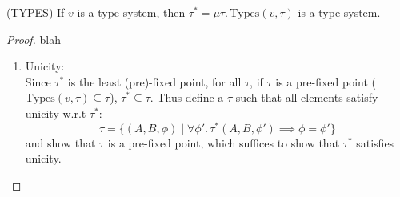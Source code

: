 \begin{lemma}(TYPES)\label{lemma:types}
If $v$ is a type system, then $\tau^* = \mu \tau.\, \text{Types}(v,\tau)$ is a type system.
\end{lemma}

\iffalse
\begin{proof}
blah
\begin{enumerate}
\item Unicity:\\
Since $\tau^*$ is the least (pre)-fixed point, for all $\tau$, if $\tau$ is a pre-fixed point 
($\text{Types}(v,\tau) \subseteq \tau$), $\tau^* \subseteq \tau$. Thus define a $\tau$ such that all elements 
satisfy unicity w.r.t $\tau^*$: 
\[\tau = \{(A,B,\phi) \mid \forall \phi'.\, \tau^*(A,B,\phi') \implies \phi = \phi'\}\]
and show that $\tau$ is a pre-fixed point, which suffices to show that $\tau^*$ satisfies unicity.


\end{enumerate}
\end{proof}
